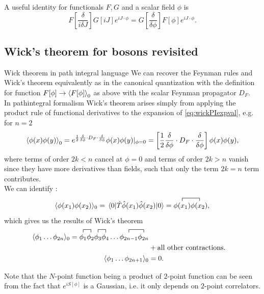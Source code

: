 A useful identity for functionals $F,G$ and a scalar field $\phi$ is
\begin{equation}
	F[\frac{\delta}{i \delta J}]G[iJ] e^{i J\cdot \phi} = G[\frac{\delta}{\delta \phi}] F[\phi] e^{i J\cdot \phi}.
\end{equation}












\subsection{Wick's theorem for bosons revisited}
\begin{mybox}{Wick theorem in path integral language}
	We can recover the Feynman rules and Wick's theorem equivalently as in the canonical quantization with the definition for function $F[\phi]\rightarrow \expval{F[\phi]}_0$ as above with the scalar Feynman propagator $D_F$.\\
	In pathintegral formalism Wick's theorem arises simply from applying the product rule of functional derivatives to the expansion of \ref{eq:wickPIexpval}, e.g. for $n=2$
	\begin{equation}
		\expval{\phi(x) \phi(y)}_0 = e^{\frac{1}{2} \frac{\delta}{\delta \phi} \cdot D_F\cdot \frac{\delta}{\delta \phi} } \phi(x) \phi(y) |_{\phi=0} = \left[\frac{1}{2} \frac{\delta}{\delta \phi} \cdot D_F \cdot \frac{\delta}{\delta \phi}\right] \phi(x) \phi(y),
	\end{equation}
	where terms of order $2k<n$ cancel at $\phi=0$ and terms of order $2k>n$ vanish since they have more derivatives than fields, such that only the term $2k=n$ term contributes.\\
	We can identify :
	\begin{equation}
		\langle \phi(x_1) \phi(x_2) \rangle_0 = \expval{\hat{T} \hat{\phi}(x_1) \hat{\phi}(x_2)}{0} = \contraction{}{\phi(x_1)}{}{\phi(x_2)} \phi(x_1) \phi(x_2),
	\end{equation}
	which gives us the results of Wick's theorem
	\begin{align}
		\langle \phi_1 \dots \phi_{2n} \rangle_0 = \contraction{}{\phi_1}{}{\phi_2} \phi_1 \phi_2 \contraction{}{\phi_3}{}{\phi_4} \phi_3 \phi_4 \dots \contraction{}{\phi_{2n-1}}{}{\phi_{2n}}  \phi_{2n-1} \phi_{2n}  \\
		&+ \text{all other contractions}.\nonumber \\
		\langle \phi_1 \dots \phi_{2n+1} \rangle_0 &=0.
	\end{align}
\end{mybox}
Note that the $N$-point function being a product of $2$-point function can be seen from the fact that $e^{iS[\phi]}$ is a Gaussian, i.e. it only depends on $2$-point correlators.
